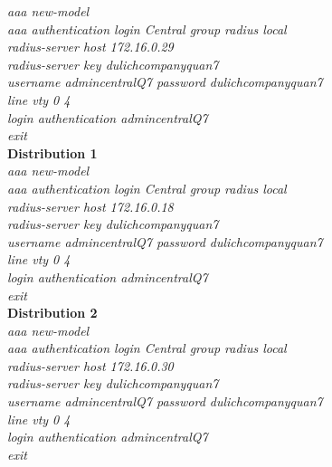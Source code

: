 \documentclass[a4paper, 12pt]{article}
\begin{document}
\hspace*{2cm}\textit{aaa new-model\\
\hspace*{2cm}aaa authentication login Central group radius local\\
\hspace*{2cm}radius-server host 172.16.0.29\\
\hspace*{2cm}radius-server key dulichcompanyquan7\\
\hspace*{2cm}username admincentralQ7 password dulichcompanyquan7\\
\hspace*{2cm}line vty 0 4\\
\hspace*{2cm}login authentication admincentralQ7\\
\hspace*{2cm}exit}\\
\hspace*{1cm} \textbf{Distribution 1}\\
\hspace*{2cm}\textit{aaa new-model\\
\hspace*{2cm}aaa authentication login Central group radius local\\
\hspace*{2cm}radius-server host 172.16.0.18\\
\hspace*{2cm}radius-server key dulichcompanyquan7\\
\hspace*{2cm}username admincentralQ7 password dulichcompanyquan7\\
\hspace*{2cm}line vty 0 4\\
\hspace*{2cm}login authentication admincentralQ7\\
\hspace*{2cm}exit}\\
\hspace*{1cm} \textbf{Distribution 2}\\
\hspace*{2cm}\textit{aaa new-model\\
\hspace*{2cm}aaa authentication login Central group radius local\\
\hspace*{2cm}radius-server host 172.16.0.30\\
\hspace*{2cm}radius-server key dulichcompanyquan7\\
\hspace*{2cm}username admincentralQ7 password dulichcompanyquan7\\
\hspace*{2cm}line vty 0 4\\
\hspace*{2cm}login authentication admincentralQ7\\
\hspace*{2cm}exit}\\
\end{document}
